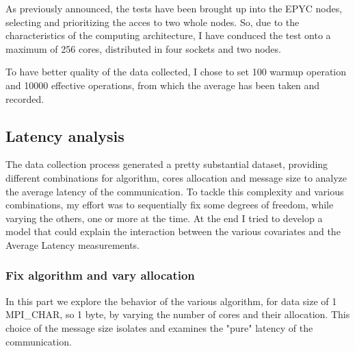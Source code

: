 \documentclass{article}
\begin{document}
	As previously announced, the tests have been brought up into the EPYC nodes, selecting and prioritizing the acces to two whole nodes. So, due to the characteristics of the computing architecture, I have conduced the test onto a maximum of 256 cores, distributed in four sockets and two nodes.
	
	To have better quality of the data collected, I chose to set 100 warmup operation and 10000 effective operations, from which the average has been taken and recorded.
	
	\subsection{Latency analysis}
	
	The data collection process generated a pretty substantial dataset, providing different combinations for algorithm, cores allocation and message size to analyze the average latency of the communication.
	To tackle this complexity and various combinations, my effort was to sequentially fix some degrees of freedom, while varying the others, one or more at the time. At the end I tried to develop a model that could explain the interaction between the various covariates and the Average Latency measurements.
	
	\subsubsection{Fix algorithm and vary allocation}
	
	In this part we explore the behavior of the various algorithm, for data size of 1 MPI\_CHAR, so 1 byte, by varying the number of cores and their allocation. This choice of the message size isolates and examines the "pure" latency of the communication.
	
\end{document}
